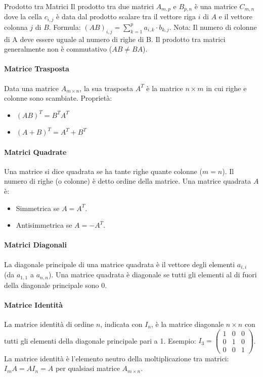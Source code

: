 \documentclass{article}
\begin{document}
\begin{definitionbox}{Prodotto tra Matrici}
    Il prodotto tra due matrici $A_{m,p}$ e $B_{p,n}$ è una matrice $C_{m,n}$ dove la cella $c_{i,j}$ è data dal prodotto scalare tra il vettore riga $i$ di $A$ e il vettore colonna $j$ di $B$.
    Formula: $(AB)_{i,j} = \sum_{k=1}^{p} a_{i,k} \cdot b_{k,j}$.
    Nota: Il numero di colonne di A deve essere uguale al numero di righe di B. Il prodotto tra matrici generalmente non è commutativo ($AB \neq BA$).
\end{definitionbox}

\paragraph{Matrice Trasposta} Data una matrice $A_{m \times n}$, la sua trasposta $A^T$ è la matrice $n \times m$ in cui righe e colonne sono scambiate.
Proprietà:
\begin{itemize}
    \item $(AB)^T = B^T A^T$
    \item $(A+B)^T = A^T + B^T$
\end{itemize}

\paragraph{Matrici Quadrate} Una matrice si dice quadrata se ha tante righe quante colonne ($m=n$). Il numero di righe (o colonne) è detto ordine della matrice.
Una matrice quadrata $A$ è:
\begin{itemize}
    \item Simmetrica se $A = A^T$.
    \item Antisimmetrica se $A = -A^T$.
\end{itemize}

\paragraph{Matrici Diagonali} La diagonale principale di una matrice quadrata è il vettore degli elementi $a_{i,i}$ (da $a_{1,1}$ a $a_{n,n}$).
Una matrice quadrata è diagonale se tutti gli elementi al di fuori della diagonale principale sono 0.

\paragraph{Matrice Identità} La matrice identità di ordine $n$, indicata con $I_n$, è la matrice diagonale $n \times n$ con tutti gli elementi della diagonale principale pari a 1.
Esempio: $I_3 = \begin{pmatrix} 1 & 0 & 0 \\ 0 & 1 & 0 \\ 0 & 0 & 1 \end{pmatrix}$.
La matrice identità è l'elemento neutro della moltiplicazione tra matrici: $I_m A = A I_n = A$ per qualsiasi matrice $A_{m \times n}$.
\end{document}

